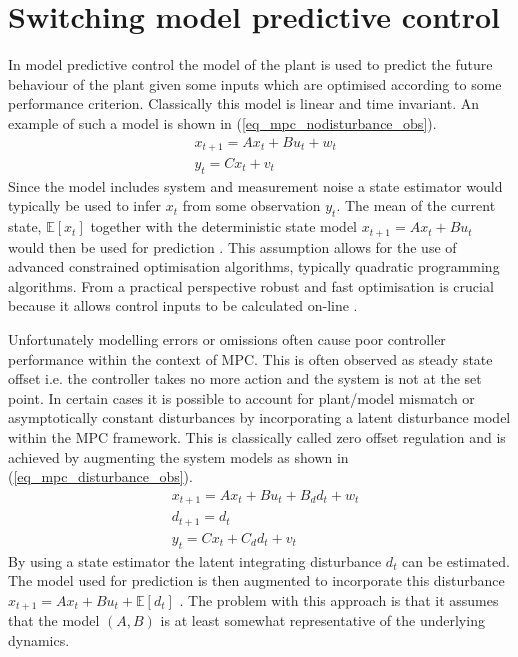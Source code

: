\section{Switching model predictive control}
\label{sec_switch_mpc_lit}
In model predictive control the model of the plant is used to predict the future behaviour of the plant given some inputs which are optimised according to some performance criterion. Classically this model is linear and time invariant. An example of such a model is shown in (\ref{eq_mpc_nodisturbance_obs}). 
\begin{equation}
\begin{aligned}
&x_{t+1} = Ax_t + Bu_t + w_t \\
&y_t = Cx_t + v_t
\end{aligned}
\label{eq_mpc_nodisturbance_obs}
\end{equation}
Since the model includes system and measurement noise a state estimator would typically be used to infer $x_t$ from some observation $y_t$. The mean of the current state, $\mathbb{E}[x_t]$ together with the deterministic state model $x_{t+1} = Ax_t + Bu_t$ would then be used for prediction \cite{raw}. This assumption allows for the use of advanced constrained optimisation algorithms, typically quadratic programming algorithms. From a practical perspective robust and fast optimisation is crucial because it allows control inputs to be calculated on-line \cite{mac}.

Unfortunately modelling errors or omissions often cause poor controller performance within the context of MPC. This is often observed as steady state offset i.e. the controller takes no more action and the system is not at the set point. In certain cases it is possible to account for plant/model mismatch or asymptotically constant disturbances by incorporating a latent disturbance model within the MPC framework. This is classically called zero offset regulation \cite{raw} and is achieved by augmenting the system models as shown in (\ref{eq_mpc_disturbance_obs}).
\begin{equation}
\begin{aligned}
&x_{t+1} = Ax_t + Bu_t + B_d d_t + w_t \\
&d_{t+1} = d_t\\
&y_t = Cx_t + C_d d_t + v_t
\end{aligned}
\label{eq_mpc_disturbance_obs}
\end{equation}
By using a state estimator the latent integrating disturbance $d_t$ can be estimated. The model used for prediction is then augmented to incorporate this disturbance $x_{t+1} = Ax_t + Bu_t + \mathbb{E}[d_t]$ \cite{lee}. The problem with this approach is that it assumes that the model $(A, B)$ is at least somewhat representative of the underlying dynamics.


